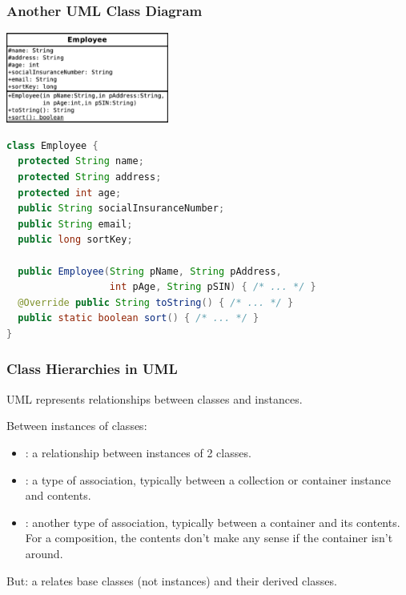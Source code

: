 \begin{frame}[fragile]
\frametitle{Another UML Class Diagram}

\begin{changemargin}{1cm}

\begin{center}
\includegraphics[height=8em]{images/Employee.pdf}
\end{center}

\begin{lstlisting}[language={Java},basicstyle=\scriptsize]
class Employee {
  protected String name;
  protected String address;
  protected int age;
  public String socialInsuranceNumber;
  public String email;
  public long sortKey;

  public Employee(String pName, String pAddress, 
                  int pAge, String pSIN) { /* ... */ }
  @Override public String toString() { /* ... */ }
  public static boolean sort() { /* ... */ }
}
\end{lstlisting}
\end{changemargin}
\end{frame}

\begin{frame}
\frametitle{Class Hierarchies in UML}

\begin{changemargin}{1cm}
UML represents relationships
between classes and instances.

Between instances of classes:
\begin{itemize}
\item {}: a relationship between instances
of 2 classes.
\item {}: a type of association, typically between a
collection or container instance and contents.
\item {}: another type of association, typically
between a container and its contents. \\
For a composition, the contents
don't make any sense if the container isn't around.
\end{itemize}

But: a  relates base classes (not
instances) and their derived classes.
\end{changemargin}
\end{frame}

